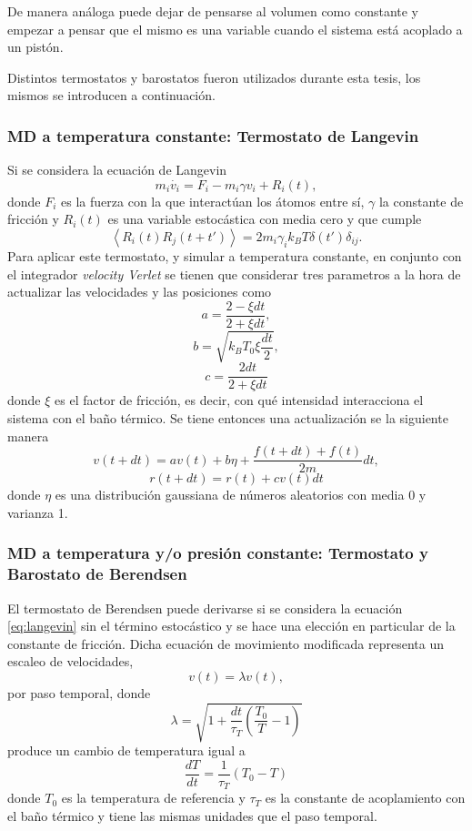 De manera análoga puede dejar de pensarse al volumen como constante y empezar a
pensar que el mismo es una variable cuando el sistema está acoplado a un pistón.

Distintos termostatos y barostatos fueron utilizados durante esta tesis, los mismos 
se introducen a continuación.

\subsubsection{MD a temperatura constante: Termostato de Langevin}

Si se considera la ecuación de Langevin \cite{schneider1978}
\begin{equation}\label{eq:langevin}
    m_i \dot{v_i} = F_i - m_i \gamma v_i + R_i(t),
\end{equation}
donde $F_i$ es la fuerza con la que interactúan los átomos entre sí, $\gamma$ la
constante de fricción y $R_i(t)$ es una variable estocástica con media cero 
y que cumple
$$
\left\langle R_i(t) R_j(t+t') \right\rangle = 2m_i \gamma_i k_B T \delta(t') \delta_{ij}.
$$
Para aplicar este termostato, y simular a temperatura constante, en conjunto con 
el integrador \textit{velocity Verlet} se tienen que considerar tres parametros
\cite{kroger2005} a la hora de actualizar las velocidades y las posiciones como
$$
a = \frac{2 - \xi dt}{2 + \xi dt},
$$
$$
b= \sqrt{k_B T_0 \xi \frac{dt}{2}},
$$
$$
c= \frac{2 dt}{2 + \xi dt}
$$
donde $\xi$ es el factor de fricción, es decir, con qué intensidad interacciona 
el sistema con el baño térmico. Se tiene entonces una actualización se la siguiente
manera
$$
v(t+dt) = a v(t) + b \eta + \frac{f(t+dt)+f(t)}{2m} dt,
$$
$$
r(t+dt) = r(t) + c v(t) dt
$$
donde $\eta$ es una distribución gaussiana de números aleatorios con media 0 y
varianza 1. 

\subsubsection{MD a temperatura y/o presión constante: Termostato y Barostato 
de Berendsen}

El termostato de Berendsen \cite{berendsen1984} puede derivarse si se considera 
la ecuación \ref{eq:langevin} sin el término estocástico y se hace una elección
en particular de la constante de fricción. Dicha ecuación de movimiento modificada
representa un escaleo de velocidades, 
$$
v(t) = \lambda v(t),
$$
por paso temporal, donde
$$
\lambda = \sqrt{1 + \frac{dt}{\tau_T} \left( \frac{T_0}{T} - 1 \right)}
$$
produce un cambio de temperatura igual a
$$
\frac{dT}{dt} = \frac{1}{\tau_T} (T_0 - T)
$$
donde $T_0$ es la temperatura de referencia y  $\tau_T$ es la constante de
acoplamiento con el baño térmico y tiene las mismas unidades que el paso temporal.

